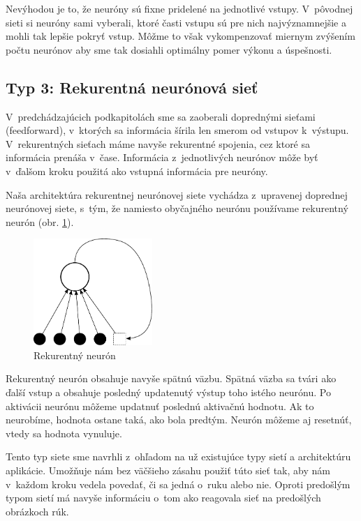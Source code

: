Nevýhodou je to, že neuróny sú fixne pridelené na jednotlivé vstupy. V~pôvodnej sieti si neuróny sami vyberali, ktoré časti vstupu sú pre nich najvýznamnejšie a mohli tak lepšie pokryť vstup. Môžme to však vykompenzovať miernym zvýšením počtu neurónov aby sme tak dosiahli optimálny pomer výkonu a úspešnosti.

\subsection{Typ 3: Rekurentná neurónová sieť}

V~predchádzajúcich podkapitolách sme sa zaoberali doprednými sieťami (feedforward), v~ktorých sa informácia šírila len smerom od vstupov k~výstupu. V~rekurentných sieťach máme navyše rekurentné spojenia, cez ktoré sa informácia prenáša v~čase. Informácia z~jednotlivých neurónov môže byť v~ďalšom kroku použitá ako vstupná informácia pre neuróny.

Naša architektúra rekurentnej neurónovej siete vychádza z~upravenej doprednej neurónovej siete, s~tým, že namiesto obyčajného neurónu používame rekurentný neurón (obr. \ref{fig:recurentneuron}). 

\begin{figure}[htbp]
  \begin{center}
    \includegraphics[width=0.4\textwidth]{images/recneuron}
  \end{center}
  \caption{Rekurentný neurón}
  \label{fig:recurentneuron}
\end{figure}

Rekurentný neurón obsahuje navyše spätnú väzbu. Spätná väzba sa tvári ako ďalší vstup a obsahuje posledný updatenutý výstup toho istého neurónu. Po aktivácii neurónu môžeme updatnuť poslednú aktivačnú hodnotu. Ak to neurobíme, hodnota ostane taká, ako bola predtým. Neurón môžeme aj resetnúť, vtedy sa hodnota vynuluje.

Tento typ siete sme navrhli z~ohľadom na už existujúce typy sietí a architektúru aplikácie. Umožňuje nám bez väčšieho zásahu použiť túto sieť tak, aby nám v~každom kroku vedela povedať, či sa jedná o~ruku alebo nie. Oproti predošlým typom sietí má navyše informáciu o~tom ako reagovala sieť na predošlých obrázkoch rúk.

